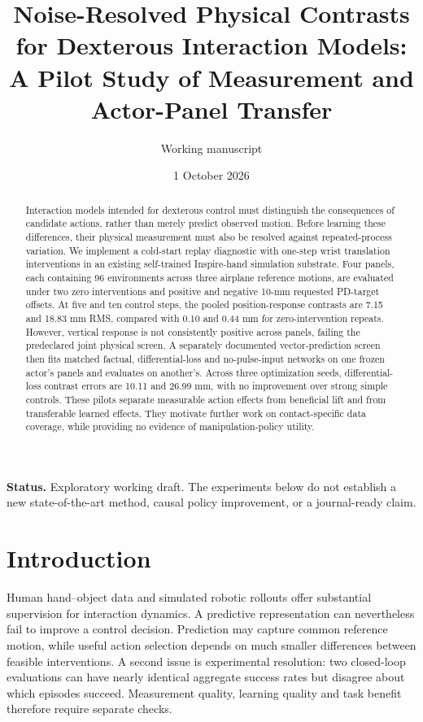 \documentclass[10pt]{article}
\title{Noise-Resolved Physical Contrasts for Dexterous Interaction Models:\\A Pilot Study of Measurement and Actor-Panel Transfer}
\author{Working manuscript}
\date{1 October 2026}
\begin{document}
\maketitle
\noindent\textbf{Status.} Exploratory working draft. The experiments below do not establish a new
state-of-the-art method, causal policy improvement, or a journal-ready claim.

\begin{abstract}
Interaction models intended for dexterous control must distinguish the consequences of
candidate actions, rather than merely predict observed motion. Before learning these
differences, their physical measurement must also be resolved against repeated-process
variation. We implement a cold-start replay diagnostic with one-step wrist translation
interventions in an existing self-trained Inspire-hand simulation substrate. Four panels,
each containing 96 environments across three airplane reference motions, are evaluated
under two zero interventions and positive and negative 10-mm requested PD-target offsets.
At five and ten control steps, the pooled position-response contrasts are 7.15 and
18.83 mm RMS, compared with 0.10 and 0.44 mm for zero-intervention repeats. However,
vertical response is not consistently positive across panels, failing the predeclared
joint physical screen. A separately documented vector-prediction screen then fits matched
factual, differential-loss and no-pulse-input networks on one frozen actor's panels and
evaluates on another's. Across three optimization seeds, differential-loss contrast errors
are 10.11 and 26.99 mm, with no improvement over strong simple controls. These pilots
separate measurable action effects from beneficial lift and from transferable learned
effects. They motivate further work on contact-specific data coverage, while providing
no evidence of manipulation-policy utility.
\end{abstract}

\section{Introduction}
Human hand--object data and simulated robotic rollouts offer substantial supervision for
interaction dynamics. A predictive representation can nevertheless fail to improve a
control decision. Prediction may capture common reference motion, while useful action
selection depends on much smaller differences between feasible interventions. A second
issue is experimental resolution: two closed-loop evaluations can have nearly identical
aggregate success rates but disagree about which episodes succeed. Measurement quality,
learning quality and task benefit therefore require separate checks.
\end{document}
